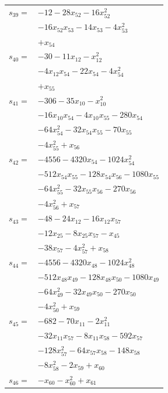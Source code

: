 \begin{longtable}{@{}r@{\;}l@{}}
\(s_{39}=\) & \(\displaystyle -12 -28x_{52} -16x_{52}^{2}\) \\
 & \(\displaystyle -16x_{52}x_{53} -14x_{53} -4x_{53}^{2}\) \\
 & \(\displaystyle +x_{54}\) \\[3pt]
\(s_{40}=\) & \(\displaystyle -30 -11x_{12} -x_{12}^{2}\) \\
 & \(\displaystyle -4x_{12}x_{54} -22x_{54} -4x_{54}^{2}\) \\
 & \(\displaystyle +x_{55}\) \\[3pt]
\(s_{41}=\) & \(\displaystyle -306 -35x_{10} -x_{10}^{2}\) \\
 & \(\displaystyle -16x_{10}x_{54} -4x_{10}x_{55} -280x_{54}\) \\
 & \(\displaystyle -64x_{54}^{2} -32x_{54}x_{55} -70x_{55}\) \\
 & \(\displaystyle -4x_{55}^{2} +x_{56}\) \\[3pt]
\(s_{42}=\) & \(\displaystyle -4556 -4320x_{54} -1024x_{54}^{2}\) \\
 & \(\displaystyle -512x_{54}x_{55} -128x_{54}x_{56} -1080x_{55}\) \\
 & \(\displaystyle -64x_{55}^{2} -32x_{55}x_{56} -270x_{56}\) \\
 & \(\displaystyle -4x_{56}^{2} +x_{57}\) \\[3pt]
\(s_{43}=\) & \(\displaystyle -48 -24x_{12} -16x_{12}x_{57}\) \\
 & \(\displaystyle -12x_{25} -8x_{25}x_{57} -x_{45}\) \\
 & \(\displaystyle -38x_{57} -4x_{57}^{2} +x_{58}\) \\[3pt]
\(s_{44}=\) & \(\displaystyle -4556 -4320x_{48} -1024x_{48}^{2}\) \\
 & \(\displaystyle -512x_{48}x_{49} -128x_{48}x_{50} -1080x_{49}\) \\
 & \(\displaystyle -64x_{49}^{2} -32x_{49}x_{50} -270x_{50}\) \\
 & \(\displaystyle -4x_{50}^{2} +x_{59}\) \\[3pt]
\(s_{45}=\) & \(\displaystyle -682 -70x_{11} -2x_{11}^{2}\) \\
 & \(\displaystyle -32x_{11}x_{57} -8x_{11}x_{58} -592x_{57}\) \\
 & \(\displaystyle -128x_{57}^{2} -64x_{57}x_{58} -148x_{58}\) \\
 & \(\displaystyle -8x_{58}^{2} -2x_{59} +x_{60}\) \\[3pt]
\(s_{46}=\) & \(\displaystyle -x_{60} -x_{60}^{2} +x_{61}\) \\[3pt]

\end{longtable}
